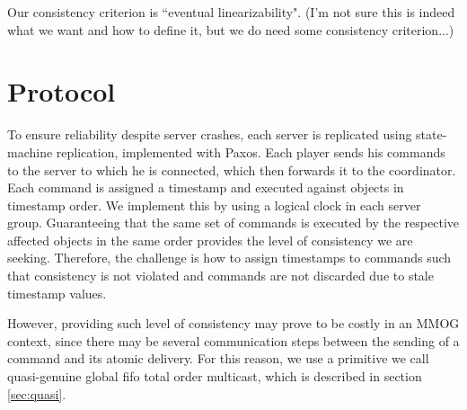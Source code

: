 \documentclass[times, 10pt]{article}
\begin{document}

Our consistency criterion is ``eventual linearizability". (I'm not sure this is indeed what we want and how to define it, but we do need some consistency criterion...)


% 
%
%



\section{Protocol}

To ensure reliability despite server crashes, each server is replicated using state-machine replication, implemented with Paxos. Each player sends his commands to the server to which he is connected, which then forwards it to the coordinator. Each command is assigned a timestamp and executed against objects in timestamp order. We implement this by using a logical clock in each server group. Guaranteeing that the same set of commands is executed by the respective affected objects in the same order provides the level of consistency we are seeking. Therefore, the challenge is how to assign timestamps to commands such that consistency is not violated and commands are not discarded due to stale timestamp values.

However, providing such level of consistency may prove to be costly in an MMOG context, since there may be several communication steps between the sending of a command and its atomic delivery. For this reason, we use a primitive we call quasi-genuine global fifo total order multicast, which is described in section \ref{sec:quasi}.
\end{document}
